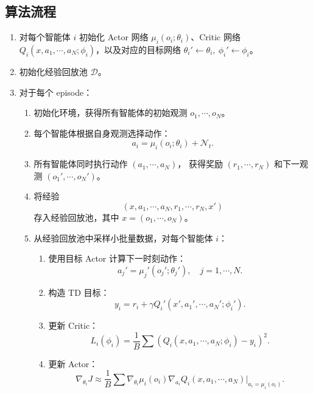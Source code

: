 \documentclass[UTF8]{ctexart}
\begin{document}
\subsection*{算法流程}

\begin{enumerate}
    \item 对每个智能体 $i$ 初始化 Actor 网络 $\mu_i(o_i;\theta_i)$、Critic 网络
    $Q_i(x,a_1,\cdots,a_N;\phi_i)$，以及对应的目标网络
    $\theta_i' \leftarrow \theta_i,\ \phi_i' \leftarrow \phi_i$。
    
    \item 初始化经验回放池 $\mathcal{D}$。
    
    \item 对于每个 episode：
    \begin{enumerate}
        \item 初始化环境，获得所有智能体的初始观测 $o_1,\cdots,o_N$。
        
        \item 每个智能体根据自身观测选择动作：
        \[
        a_i=\mu_i(o_i;\theta_i)+\mathcal{N}_t.
        \]
        
        \item 所有智能体同时执行动作 $(a_1,\cdots,a_N)$，
        获得奖励 $(r_1,\cdots,r_N)$ 和下一观测 $(o_1',\cdots,o_N')$。
        
        \item 将经验
        \[
        (x,a_1,\cdots,a_N,r_1,\cdots,r_N,x')
        \]
        存入经验回放池，其中 $x=(o_1,\cdots,o_N)$。
        
        \item 从经验回放池中采样小批量数据，对每个智能体 $i$：
        \begin{enumerate}
            \item 使用目标 Actor 计算下一时刻动作：
            \[
            a_j'=\mu_j'(o_j';\theta_j'),\quad j=1,\cdots,N.
            \]
            
            \item 构造 TD 目标：
            \[
            y_i=r_i+\gamma Q_i'(x',a_1',\cdots,a_N';\phi_i').
            \]
            
            \item 更新 Critic：
            \[
            L_i(\phi_i)
            =
            \frac{1}{B}
            \sum
            \left(
            Q_i(x,a_1,\cdots,a_N;\phi_i)-y_i
            \right)^2.
            \]
            
            \item 更新 Actor：
            \[
            \nabla_{\theta_i}J
            \approx
            \frac{1}{B}
            \sum
            \nabla_{\theta_i}\mu_i(o_i)
            \nabla_{a_i}
            Q_i(x,a_1,\cdots,a_N)
            \big|_{a_i=\mu_i(o_i)}.
            \]
            

\end{enumerate}
\end{enumerate}
\end{enumerate}
\end{document}
